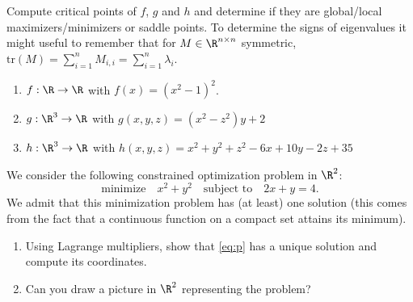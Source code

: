 \documentclass[11pt,nocut]{article}
\begin{document}




\begin{problem}[2 points]
	Compute critical points of $f$, $g$ and $h$ and determine if they are global/local maximizers/minimizers or saddle points. To determine the signs of eigenvalues it might useful to remember that for $M \in \R^{n\times n}$ symmetric, $\mathrm{tr}(M) = \sum_{i=1}^n M_{i,i} = \sum_{i=1}^n \lambda_i$.

	\begin{enumerate}[label=\normalfont(\textbf{\alph*})]
		\item $f: \R \to \R$ with $f(x) = (x^2 - 1)^2$.
		\item $g: \R^3 \to \R$ with $g(x, y, z) = (x^2 - z^2) y + 2$
		\item $h: \R^3 \to \R$ with $h(x,y,z) = x^2 + y^2 + z^2 - 6x + 10y - 2z + 35$
	\end{enumerate}
\end{problem}

\vspace{5mm}

\begin{problem}[2 points]
	We consider the following constrained optimization problem in $\R^2$:
	\begin{equation}
		\label{eq:p}
	\text{minimize} \quad x^2 + y^2 \quad \text{subject to} \quad 2x +  y = 4.
	\end{equation}
	We admit that this minimization problem has (at least) one solution (this comes from the fact that a continuous function on a compact set attains its minimum).
	\\
	\begin{enumerate}[label=\normalfont(\textbf{\alph*})]
		\item Using Lagrange multipliers, show that \eqref{eq:p} has a unique solution and compute its coordinates.
		\item Can you draw a picture in $\R^2$ representing the problem? 
	\end{enumerate}
\end{problem}

\vspace{5mm}
\end{document}
